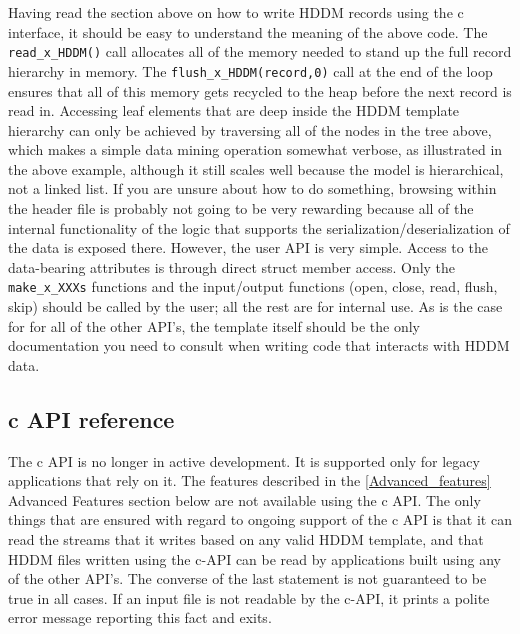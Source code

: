 \documentclass{revtex4}
\begin{document}
Having read the section above on how to write HDDM records using the c
interface, it should be easy to understand the meaning of the above code.
The \texttt{read\_x\_HDDM()} call allocates all of the memory needed to
stand up the full record hierarchy in memory. The \texttt{flush\_x\_HDDM(record,0)}
call at the end of the loop ensures that all of this memory gets recycled
to the heap before the next record is read in. Accessing leaf elements that
are deep inside the HDDM template hierarchy can only be achieved by traversing
all of the nodes in the tree above, which makes a simple data mining operation
somewhat verbose, as illustrated in the above example, although it still scales
well because the model is hierarchical, not a linked list. If you are unsure
about how to do something, browsing within the header file is probably not
going to be very rewarding because all of the internal functionality of the
logic that supports the serialization/deserialization of the data is exposed
there. However, the user API is very simple. Access to the data-bearing attributes
is through direct struct member access. Only the \texttt{make\_x\_XXXs} functions
and the input/output functions (open, close, read, flush, skip) should be called
by the user; all the rest are for internal use. As is the case for for all of the
other API's, the template itself should be the only documentation
you need to consult when writing code that interacts with HDDM data.

\subsection{c API reference}

The c API is no longer in active development. It is supported only for legacy
applications that rely on it. The features described in the \ref{Advanced_features}
{Advanced Features} section below are not available using the c API. The only things
that are ensured with regard to ongoing support of the c API is that it can read
the streams that it writes based on any valid HDDM template, and that HDDM files
written using the c-API can be read by applications built using any of the other
API's. The converse of the last statement is not guaranteed to
be true in all cases. If an input file is not readable by the c-{}API, it prints
a polite error message reporting this fact and exits.
\end{document}
